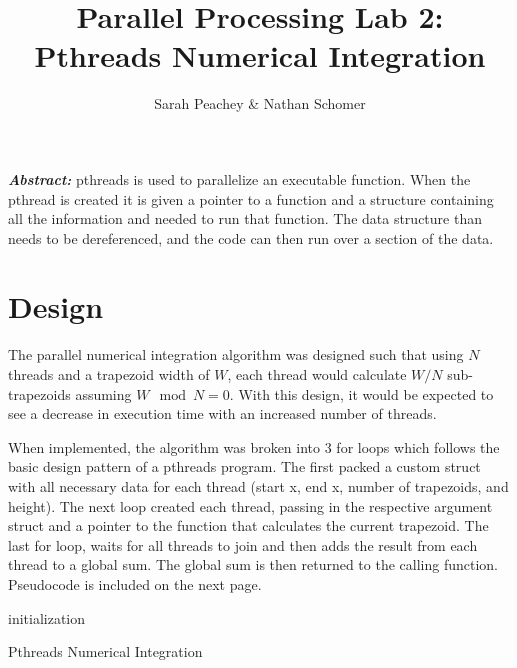 \documentclass[12pt]{article}
\begin{document}
\title{Parallel Processing Lab 2: \\ Pthreads Numerical Integration}
\author{Sarah Peachey \& Nathan Schomer}
\maketitle

\textbf{\textit{Abstract:}} pthreads is used to parallelize an executable function. 
When the pthread is created it is given a pointer to a function and a structure containing 
all the information and needed to run that function. The data structure than needs to be 
dereferenced, and the code can then run over a section of the data. 

\newpage

\vspace{-1.5cm}
\section{Design}
\vspace{-0.25cm}

\qquad The parallel numerical integration algorithm was designed such
that using $N$ threads and a trapezoid width of $W$, each thread would 
calculate $W/N$ sub-trapezoids assuming $W \mod N = 0$. With this design,
it would be expected to see a decrease in execution time with an
increased number of threads. 

When implemented, the algorithm was broken into 3 for loops which
follows the basic design pattern of a pthreads program. 
The first packed 
a custom struct with all necessary data for each thread (start x, end x, 
number of trapezoids, and height). The next loop created each thread,
passing in the respective argument struct and a pointer to the function
that calculates the current trapezoid. The last for loop, waits for
all threads to join and then adds the result from each thread to a 
global sum. The global sum is then returned to the calling function.
Pseudocode is included on the next page. 

\pagebreak
\vspace{1cm}
\begin{algorithm}[H]
 	initialization\;


   	
\caption{Pthreads Numerical Integration}
\end{algorithm}
\end{document}
